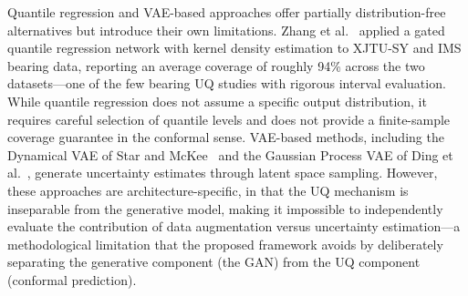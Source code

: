 \documentclass[review]{elsarticle}
\begin{document}
Quantile regression and VAE-based approaches offer partially
distribution-free alternatives but introduce their own limitations.
Zhang et al.~\cite{zhang_explainable_2025} applied a gated quantile
regression network with kernel density estimation to XJTU-SY and IMS
bearing data, reporting an average coverage of roughly 94\% across the
two datasets---one of the few bearing UQ studies with rigorous interval
evaluation. While quantile regression does not assume a
specific output distribution, it requires careful selection of
quantile levels and does not provide a finite-sample coverage
guarantee in the conformal sense. VAE-based methods, including the
Dynamical VAE of Star and McKee~\cite{star_dynamical_2025} and the
Gaussian Process VAE of Ding et al.~\cite{10738265}, generate
uncertainty estimates through latent space sampling. However, these
approaches are architecture-specific, in that the UQ mechanism is
inseparable from the generative model, making it impossible to
independently evaluate the contribution of data augmentation versus
uncertainty estimation---a methodological limitation that the proposed
framework avoids by deliberately separating the generative component
(the GAN) from the UQ component (conformal prediction).\\
\end{document}
